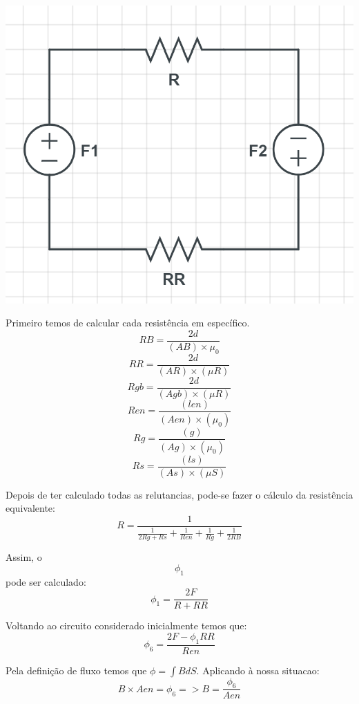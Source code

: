 \documentclass{article}
\begin{document}
\includegraphics[scale=0.5]{44}

Primeiro temos de calcular cada resistência em específico.
$$RB = \frac{2d}{(AB)\times \mu_0}$$
$$RR = \frac{2d}{(AR)\times (\mu R)}$$
$$Rgb = \frac{2d}{(Agb)\times (\mu R)}$$
$$Ren = \frac{(len)}{(Aen)\times (\mu_0)}$$
$$Rg = \frac{(g)}{(Ag)\times (\mu_0)}$$
$$Rs = \frac{(ls)}{(As)\times (\mu S)}$$

Depois de ter calculado todas as relutancias, pode-se fazer o cálculo da resistência equivalente:
$$R = \frac{1}{\frac{1}{2Rg + Rs} + \frac{1}{Ren} + \frac{1}{Rg}+\frac{1}{2RB}}$$

Assim, o $$\phi_1$$ pode ser calculado:
$$\phi_1 = \frac{2F}{R+RR}$$

Voltando ao circuito considerado inicialmente temos que:
$$\phi_6 = \frac{2F - \phi_1RR}{Ren}$$

Pela definição de fluxo temos que $\phi = \int BdS$. Aplicando à nossa situacao:
$$B\times Aen = \phi_6 => B = \frac{\phi_6}{Aen}$$
\end{document}
